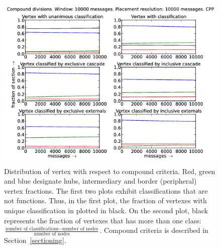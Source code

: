 \documentclass[%
 aip,
 jmp,%
 amsmath,amssymb,
 reprint,%
]{revtex4-1}
\begin{document}
\begin{figure}[hbtp] 
   \centering
        \includegraphics[width=\textwidth]{figs/CPP/10000_2}
    \caption{Distribution of vertex with respect to compound criteria. Red, green and blue designate hubs, intermediary and border (peripheral) vertex fractions. The first two plots exhibit classifications that are not functions. Thus, in the first plot, the fraction of vertexes with unique classification in plotted in black. On the second plot, black represents the fraction of vertexes that has more than one class: $\frac{\text{number of classifications} - \text{number of nodes}}{\text{number of nodes}}$. Compound criteria is described in Section~\ref{sectioning}.}
    \label{fig:cpp10000_}
\end{figure}
\end{document}
